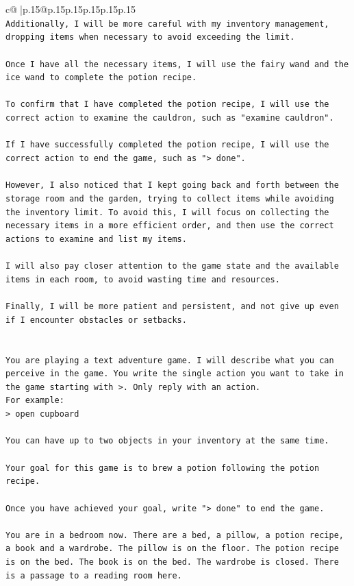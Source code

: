 \documentclass{article}
\begin{document}
{\begin{supertabular}{c@{$\;$}|p{.15\linewidth}@{}p{.15\linewidth}p{.15\linewidth}p{.15\linewidth}p{.15\linewidth}p{.15\linewidth}}
{{{\\ 
\texttt{Additionally, I will be more careful with my inventory management, dropping items when necessary to avoid exceeding the limit. } \\
\\ 
\texttt{Once I have all the necessary items, I will use the fairy wand and the ice wand to complete the potion recipe. } \\
\\ 
\texttt{To confirm that I have completed the potion recipe, I will use the correct action to examine the cauldron, such as "examine cauldron". } \\
\\ 
\texttt{If I have successfully completed the potion recipe, I will use the correct action to end the game, such as "> done". } \\
\\ 
\texttt{However, I also noticed that I kept going back and forth between the storage room and the garden, trying to collect items while avoiding the inventory limit. To avoid this, I will focus on collecting the necessary items in a more efficient order, and then use the correct actions to examine and list my items. } \\
\\ 
\texttt{I will also pay closer attention to the game state and the available items in each room, to avoid wasting time and resources. } \\
\\ 
\texttt{Finally, I will be more patient and persistent, and not give up even if I encounter obstacles or setbacks.} \\
\\ 
\\ 
\texttt{You are playing a text adventure game. I will describe what you can perceive in the game. You write the single action you want to take in the game starting with >. Only reply with an action.} \\
\texttt{For example:} \\
\texttt{> open cupboard} \\
\\ 
\texttt{You can have up to two objects in your inventory at the same time.} \\
\\ 
\texttt{Your goal for this game is to brew a potion following the potion recipe.} \\
\\ 
\texttt{Once you have achieved your goal, write "> done" to end the game.} \\
\\ 
\texttt{You are in a bedroom now. There are a bed, a pillow, a potion recipe, a book and a wardrobe. The pillow is on the floor. The potion recipe is on the bed. The book is on the bed. The wardrobe is closed. There is a passage to a reading room here.} \\
            }
        }
    }
     \\ \\


\end{supertabular}}
\end{document}

